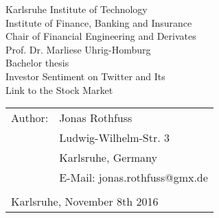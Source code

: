 \documentclass[a4paper,12pt]{article}%
\begin{document}
\begin{titlepage}
    \begin{center}
        {\Large Karlsruhe Institute of Technology\\[0.4cm]
            Institute of Finance, Banking and Insurance\\[0.3cm]
            Chair of Financial Engineering and Derivates\\[0.3cm]
            Prof. Dr. Marliese Uhrig-Homburg}\\[3.5cm]
        {\large Bachelor thesis}\\[1.5cm]
        {\Huge Investor Sentiment on Twitter and Its \\ \vspace{5mm} Link to the Stock Market}\\[8cm]
    \end{center}
    \renewcommand{\baselinestretch}{1.2}\small\normalsize
    \begin{tabular}{ll}
        Author:  & Jonas Rothfuss\\
        & Ludwig-Wilhelm-Str. 3\\
        & Karlsruhe, Germany\\
        & E-Mail: jonas.rothfuss@gmx.de\\\\
        \multicolumn{2}{l}{Karlsruhe, November 8th 2016}
    \end{tabular}
    \vfill
\end{titlepage}

\sloppy

\onehalfspacing

\pagebreak%
\doublespacing %

\setcounter{page}{1}
\tableofcontents
\newpage
\listoffigures
{}
\newpage
\listoftables
{}
\newpage
\end{document}
